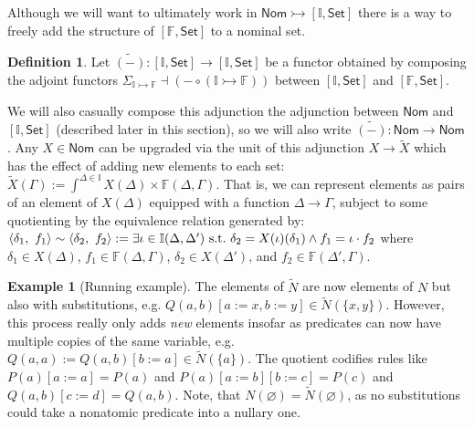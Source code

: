 \documentclass{article}
\theoremstyle{definition}
\newtheorem{definition}{Definition}[section]
\newtheorem{example}{Example}[section]
\newcommand{\II}{\mathbb{I}}
\newcommand{\FF}{\mathbb{F}}
\newcommand{\cat}[1]{\mathsf{#1}}
\newcommand{\Set}{\cat{Set}}
\newcommand{\Nom}{\cat{Nom}}
\begin{document}
Although we will want to ultimately work in $\Nom\rightarrowtail [\II,\Set]$ there is a way to freely add the structure of $[\FF,\Set]$ to a nominal set.

\begin{definition}
    \label{def:tilde}
    Let $\widetilde{(-)} \colon [\II,\Set]\to [\II,\Set]$ be a functor obtained by composing the adjoint functors ${\Sigma_{\II\rightarrowtail \FF} \dashv (- \circ ({\II\rightarrowtail \FF}))}$ between $[\II,\Set]$ and $[\FF,\Set]$.
\end{definition}

We will also casually compose this adjunction the adjunction between $\Nom$ and $[\II,\Set]$ (described later in this section), so we will also write $\widetilde{(-)}\colon \Nom\to\Nom$. Any $X \in \Nom$ can be upgraded via the unit of this adjunction $X\rightarrow \widetilde{X}$ which has the effect of adding new elements to each set: $\widetilde{X}(\Gamma):= \int^{\Delta \in \II} X(\Delta) \times \FF(\Delta,\Gamma)$. 
 That is, we can represent elements as pairs of an element of $X(\Delta)$ equipped with a function $\Delta \to \Gamma$, subject to some quotienting by the equivalence relation generated by: 
$\langle\delta_1 ,\ f_1 \rangle\sim \langle\delta_2,\ f_2\rangle := \exists \iota\in \II( \Delta,\Delta') {\rm\ s.t.\ } \delta_2=X(\iota)(\delta_1) \wedge f_1 = \iota\cdot f_2$ where $\delta_1 \in X(\Delta)$, $f_1 \in \FF(\Delta,\Gamma)$, $\delta_2\in X(\Delta')$, and $f_2\in \FF(\Delta',\Gamma)$.


\begin{example}[Running example]
\label{ex:subst}
The elements of $\widetilde{N}$ are now elements of $N$ but also with substitutions, e.g. $Q(a,b)[a:=x, b:=y] \in \widetilde{N}(\{x,y\})$. 
However, this process really only adds {\it new} elements insofar as predicates can now have multiple copies of the same variable, e.g. $Q(a,a):=Q(a,b)[b:=a] \in \widetilde{N}(\{a\})$. 
The quotient codifies rules like $P(a)[a:=a]=P(a)$ and $P(a)[a:=b][b:=c]=P(c)$ and $Q(a,b)[c:=d]=Q(a,b)$. 
Note, that $N(\varnothing)=\widetilde{N}(\varnothing)$, as no substitutions could take a nonatomic predicate into a nullary one.    
\end{example}
\end{document}
